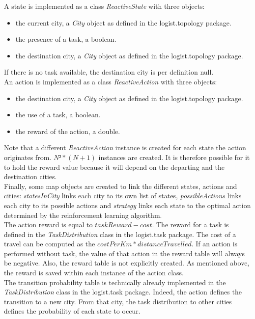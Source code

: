 \documentclass[11pt]{article}
\begin{document}
A state is implemented as a class \textit{ReactiveState} with three objects:
\begin{itemize}
    \item the current city, a \textit{City} object as defined in the logist.topology package.
    \item the presence of a task, a boolean.
    \item the destination city, a \textit{City} object as defined in the logist.topology package.
\end{itemize}
If there is no task available, the destination city is per definition null.\\

An action is implemented as a class \textit{ReactiveAction} with three objects:
\begin{itemize}
    \item the destination city, a \textit{City} object as defined in the logist.topology package.
    \item the use of a task, a boolean.
    \item the reward of the action, a double.
\end{itemize}
Note that a different \textit{ReactiveAction} instance is created for each state the action originates from. $N²*(N+1)$ instances are created. It is therefore possible for it to hold the reward value because it will depend on the departing and the destination cities.\\

Finally, some map objects are created to link the different states, actions and cities: \textit{statesInCity} links each city to its own list of states, \textit{possibleActions} links each city to its possible actions and \textit{strategy} links each state to the optimal action determined by the reinforcement learning algorithm.\\

The action reward is equal to $taskReward-cost$. The reward for a task is defined in the \textit{TaskDistribution} class in the logist.task package. The cost of a travel can be computed as the $costPerKm*distanceTravelled$. If an action is performed without task, the value of that action in the reward table will always be negative. Also, the reward table is not explicitly created. As mentioned above, the reward is saved within each instance of the action class.\\

The transition probability table is technically already implemented in the \textit{TaskDistribution} class in the logist.task package. Indeed, the action defines the transition to a new city. From that city, the task distribution to other cities defines the probability of each state to occur.
\end{document}
